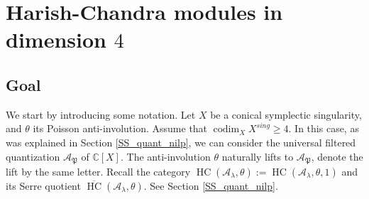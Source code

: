 \documentclass[12pt]{amsart}
\newcommand{\C}{\mathbb{C}}
\newcommand{\A}{\mathcal{A}}
\newcommand{\gr}{\operatorname{gr}}
\newcommand{\HC}{\operatorname{HC}}
\newcommand{\param}{\mathfrak{P}}
\newtheorem{Lem}[Thm]{Lemma}
\theoremstyle{definition}
\numberwithin{equation}{section}
\begin{document}

\section{Harish-Chandra modules in dimension $4$}
\subsection{Goal}\label{SS_goals}
We start by introducing some notation. Let $X$ be a conical symplectic singularity,
 and $\theta$ its Poisson anti-involution.
Assume that $\operatorname{codim}_X X^{sing}\geqslant 4$. In this case, as was explained in
Section \ref{SS_quant_nilp}, we can consider
the universal filtered quantization $\A_{\param}$ of $\C[X]$.
The anti-involution $\theta$ naturally lifts to $\A_{\param}$, denote the
lift by the same letter. Recall the category $\HC(\A_\lambda,\theta):=\HC(\A_\lambda,\theta,1)$ and its Serre quotient $\overline{\HC}(\A_\lambda,\theta)$. See Section \ref{SS_quant_nilp}.
\end{document}
